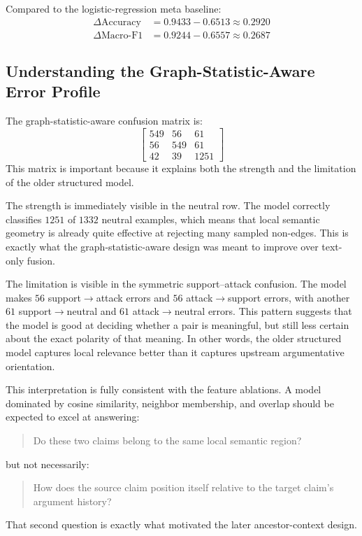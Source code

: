 \documentclass[11pt,a4paper]{article}
\begin{document}
Compared to the logistic-regression meta baseline:
\begin{align*}
\Delta \text{Accuracy} &= 0.9433 - 0.6513 \approx 0.2920 \\
\Delta \text{Macro-F1} &= 0.9244 - 0.6557 \approx 0.2687
\end{align*}

\subsection{Understanding the Graph-Statistic-Aware Error Profile}
The graph-statistic-aware confusion matrix is:
\[
\begin{bmatrix}
549 & 56 & 61 \\
56 & 549 & 61 \\
42 & 39 & 1251
\end{bmatrix}
\]
This matrix is important because it explains both the strength and the limitation of the older structured model.

The strength is immediately visible in the neutral row. The model correctly classifies \(1251\) of \(1332\) neutral
examples, which means that local semantic geometry is already quite effective at rejecting many sampled non-edges. This
is exactly what the graph-statistic-aware design was meant to improve over text-only fusion.

The limitation is visible in the symmetric support--attack confusion. The model makes \(56\) support\(\rightarrow\)attack
errors and \(56\) attack\(\rightarrow\)support errors, with another \(61\) support\(\rightarrow\)neutral and \(61\)
attack\(\rightarrow\)neutral errors. This pattern suggests that the model is good at deciding whether a pair is
meaningful, but still less certain about the exact polarity of that meaning. In other words, the older structured model
captures local relevance better than it captures upstream argumentative orientation.

This interpretation is fully consistent with the feature ablations. A model dominated by cosine similarity, neighbor
membership, and overlap should be expected to excel at answering:
\begin{quote}
Do these two claims belong to the same local semantic region?
\end{quote}
but not necessarily:
\begin{quote}
How does the source claim position itself relative to the target claim's argument history?
\end{quote}
That second question is exactly what motivated the later ancestor-context design.
\end{document}
